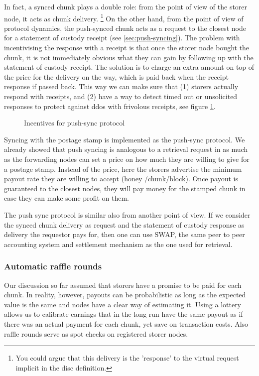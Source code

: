 In fact, a synced chunk plays a double role: from the point of view of the storer node, it acts as chunk delivery.
%
\footnote{You could argue that this delivery is the 'response' to the virtual request implicit in the disc definition.}
%
On the other hand, from the point of view of protocol dynamics, the  push-synced chunk acts as a request to the closest node for a statement of custody receipt (see \ref{sec:push-syncing}). The problem with incentivising the response with a receipt is that once the storer node bought the chunk, it is not immediately obvious what they can gain by following up with the statement of custody receipt. The solution is to charge an extra amount on top of the price for the delivery on the way,  which is paid back when the receipt response if passed back. This way we can make sure that (1) storers actually respond with receipts, and (2) have a way to detect timed out or unsolicited responses to protect against ddos with frivolous receipts, see figure \ref{fig:syncing-swap}.


\begin{figure}[htbp]
\centering
\caption[Incentives for push-sync protocol]{Incentives for push-sync protocol}
\label{fig:syncing-swap}
\end{figure}

Syncing with the postage stamp is implemented as the push-sync protocol. We already showed that push syncing is analogous to a retrieval request in as much as the forwarding nodes can set a price on how much they are willing to give for a postage stamp. Instead of the price, here the storers advertise the minimum payout rate they are willing to accept (honey
/chunk/block). Once payout is guaranteed to the closest nodes, they will pay money for the stamped chunk in case they can make some profit on them. 

The push sync protocol is similar also from another point of view. If we consider the synced chunk delivery as request and the statement of custody response as delivery the requestor pays for, then one can use SWAP, the same peer to peer accounting system and settlement mechanism  as the one used for retrieval.


\subsubsection{Automatic raffle rounds}

Our discussion so far assumed that storers have a promise to be paid for each chunk. In reality, however,  payouts can be probabilistic as long as the expected value is the same and  nodes have a clear way of estimating it. Using a lottery allows us to calibrate earnings that in the long run have the same payout as if there was an actual payment for each chunk, yet save on transaction costs. Also raffle rounds serve as spot checks on registered storer nodes. 


